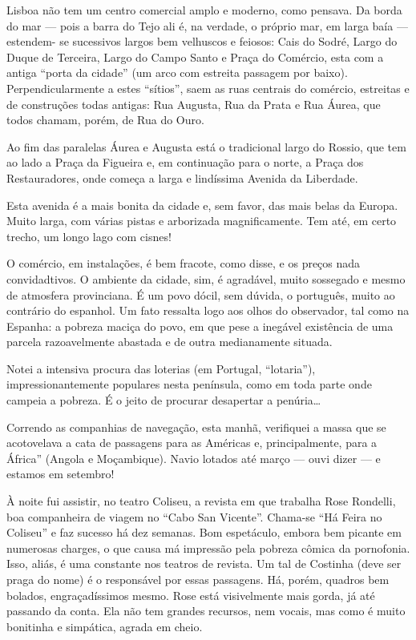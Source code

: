 Lisboa não tem um centro comercial amplo e moderno, como pensava. Da borda do mar --- pois a barra do Tejo ali é, na verdade, o próprio mar, em larga baía --- estendem- se sucessivos largos bem velhuscos e feiosos: Cais do Sodré, Largo do Duque de Terceira, Largo do Campo Santo e Praça do Comércio, esta com a antiga ``porta da cidade'' (um arco com estreita passagem por baixo). Perpendicularmente a estes ``sítios'', saem as ruas centrais do comércio, estreitas e de construções todas antigas: Rua Augusta, Rua da Prata e Rua Áurea, que todos chamam, porém, de Rua do Ouro.

Ao fim das paralelas Áurea e Augusta está o tradicional largo do Rossio, que tem ao lado a Praça da Figueira e, em continuação para o norte, a Praça dos Restauradores, onde começa a larga e lindíssima Avenida da Liberdade.

Esta avenida é a mais bonita da cidade e, sem favor, das mais belas da Europa. Muito larga, com várias pistas e arborizada magnificamente. Tem até, em certo trecho, um longo lago com cisnes!

O comércio, em instalações, é bem fracote, como disse, e os preços nada convidadtivos. O ambiente da cidade, sim, é agradável, muito sossegado e mesmo de atmosfera provinciana. É um povo dócil, sem dúvida, o português, muito ao contrário do espanhol. Um fato ressalta logo aos olhos do observador, tal como na Espanha: a pobreza maciça do povo, em que pese a inegável existência de uma parcela razoavelmente abastada e de outra medianamente situada.

Notei a intensiva procura das loterias (em Portugal, ``lotaria''), impressionantemente populares nesta península, como em toda parte onde campeia a pobreza. É o jeito de procurar desapertar a penúria\ldots

Correndo as companhias de navegação, esta manhã, verifiquei a massa que se acotovelava a cata de passagens para as Américas e, principalmente, para a África'' (Angola e Moçambique). Navio lotados até março --- ouvi dizer --- e estamos em setembro!

À noite fui assistir, no teatro Coliseu, a revista em que trabalha Rose Rondelli, boa companheira de viagem no ``Cabo San Vicente''. Chama-se ``Há Feira no Coliseu'' e faz sucesso há dez semanas. Bom espetáculo, embora bem picante em numerosas charges, o que causa má impressão pela pobreza cômica da pornofonia. Isso, aliás, é uma constante nos teatros de revista. Um tal de Costinha (deve ser praga do nome) é o responsável por essas passagens. Há, porém, quadros bem bolados, engraçadíssimos mesmo. Rose está visivelmente mais gorda, já até passando da conta. Ela não tem grandes recursos, nem vocais, mas como é muito bonitinha e simpática, agrada em cheio.

